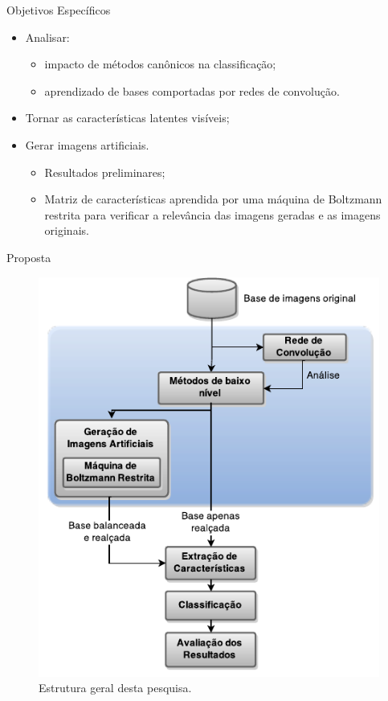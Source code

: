 \documentclass{beamer}
\begin{document}
\begin{frame}{Objetivos Específicos}
\setlength\leftmargini{1em}
\justifying
    \begin{itemize}
      \item Analisar:
        \begin{itemize}
          \item impacto de métodos canônicos na classificação;
          \item aprendizado de bases comportadas por redes de convolução.
        \end{itemize}
      \item Tornar as características latentes visíveis;%
      \item Gerar imagens artificiais.
      \pause
        \begin{itemize}
          \item Resultados preliminares;
          \item Matriz de características aprendida por uma máquina de Boltzmann restrita para verificar a relevância das imagens geradas e as imagens originais.
        \end{itemize}
    \end{itemize}
\end{frame}
\begin{frame}{Proposta}
\begin{figure}
    \includegraphics[height=0.75\textheight]{figuras/geral.pdf}
    \caption{Estrutura geral desta pesquisa.}
\end{figure}
\end{frame}
\end{document}
